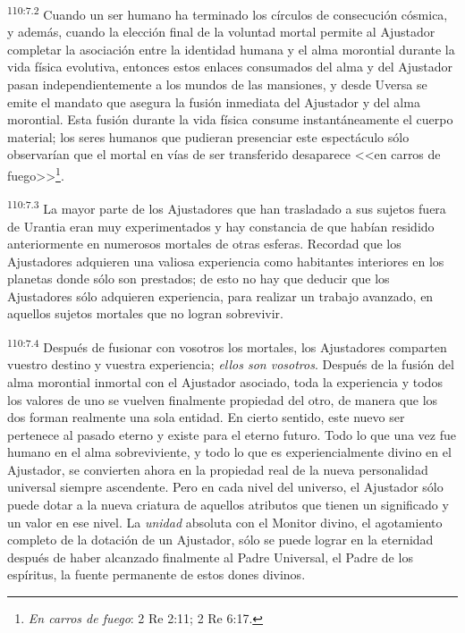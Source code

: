 \documentclass[twoside, 11pt]{book}
\begin{document}
\par
\textsuperscript{110:7.2} Cuando un ser humano ha terminado los círculos de consecución cósmica, y además, cuando la elección final de la voluntad mortal permite al Ajustador completar la asociación entre la identidad humana y el alma morontial durante la vida física evolutiva, entonces estos enlaces consumados del alma y del Ajustador pasan independientemente a los mundos de las mansiones, y desde Uversa se emite el mandato que asegura la fusión inmediata del Ajustador y del alma morontial. Esta fusión durante la vida física consume instantáneamente el cuerpo material; los seres humanos que pudieran presenciar este espectáculo sólo observarían que el mortal en vías de ser transferido desaparece <<en carros de fuego>>\footnote{\textit{En carros de fuego}: 2 Re 2:11; 2 Re 6:17.}.

\par
\textsuperscript{110:7.3} La mayor parte de los Ajustadores que han trasladado a sus sujetos fuera de Urantia eran muy experimentados y hay constancia de que habían residido anteriormente en numerosos mortales de otras esferas. Recordad que los Ajustadores adquieren una valiosa experiencia como habitantes interiores en los planetas donde sólo son prestados; de esto no hay que deducir que los Ajustadores sólo adquieren experiencia, para realizar un trabajo avanzado, en aquellos sujetos mortales que no logran sobrevivir.

\par
\textsuperscript{110:7.4} Después de fusionar con vosotros los mortales, los Ajustadores comparten vuestro destino y vuestra experiencia; \textit{ellos son vosotros}. Después de la fusión del alma morontial inmortal con el Ajustador asociado, toda la experiencia y todos los valores de uno se vuelven finalmente propiedad del otro, de manera que los dos forman realmente una sola entidad. En cierto sentido, este nuevo ser pertenece al pasado eterno y existe para el eterno futuro. Todo lo que una vez fue humano en el alma sobreviviente, y todo lo que es experiencialmente divino en el Ajustador, se convierten ahora en la propiedad real de la nueva personalidad universal siempre ascendente. Pero en cada nivel del universo, el Ajustador sólo puede dotar a la nueva criatura de aquellos atributos que tienen un significado y un valor en ese nivel. La \textit{unidad} absoluta con el Monitor divino, el agotamiento completo de la dotación de un Ajustador, sólo se puede lograr en la eternidad después de haber alcanzado finalmente al Padre Universal, el Padre de los espíritus, la fuente permanente de estos dones divinos.
\end{document}
